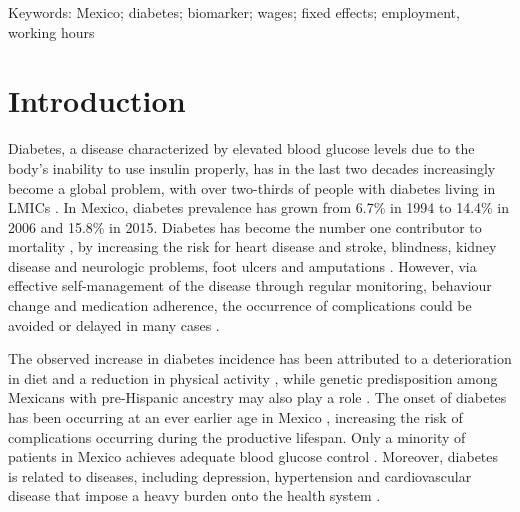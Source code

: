 \documentclass[12pt,english]{article}
\begin{document}
\noindent Keywords: Mexico; diabetes; biomarker; wages; fixed effects; employment, working hours


\section{\label{sec:Introduction}Introduction }

Diabetes, a disease characterized by elevated blood glucose levels due to the body's inability to use insulin properly, has in the last two decades increasingly become a global problem, with over two-thirds of people with diabetes living in \acp{LMIC} \parencite{InternationalDiabetesFederation2015}. In Mexico, diabetes prevalence has grown from 6.7\% in 1994 to 14.4\% in 2006 \parencite{Barquera2013} and 15.8\% in 2015. Diabetes has become the number one contributor to mortality \parencite{InternationalDiabetesFederation2015}, by increasing the risk for heart disease and stroke, blindness, kidney disease and neurologic problems, foot ulcers and amputations \parencite{Reynoso-Noveron2011}. However, via effective self-management of the disease through regular monitoring, behaviour change and medication adherence, the occurrence of complications could be avoided or delayed in many cases \parencite{Lim2011, Gregg2012}.

The observed increase in diabetes incidence has been attributed to a deterioration in diet and a reduction in physical activity \parencite{Barquera2008b,Basu2013}, while genetic predisposition among Mexicans with pre-Hispanic ancestry may also play a role \parencite{Williams2013}. The onset of diabetes has been occurring at an ever earlier age in Mexico \parencite{Bello-Chavolla2017a}, increasing the risk of complications occurring during the productive lifespan. Only a minority of patients in Mexico achieves adequate blood glucose control \parencite{Barquera2013}. Moreover, diabetes is related to diseases, including depression, hypertension and cardiovascular disease that impose a heavy burden onto the health system \parencite{WorldHealthOrganization2016}.
\end{document}
